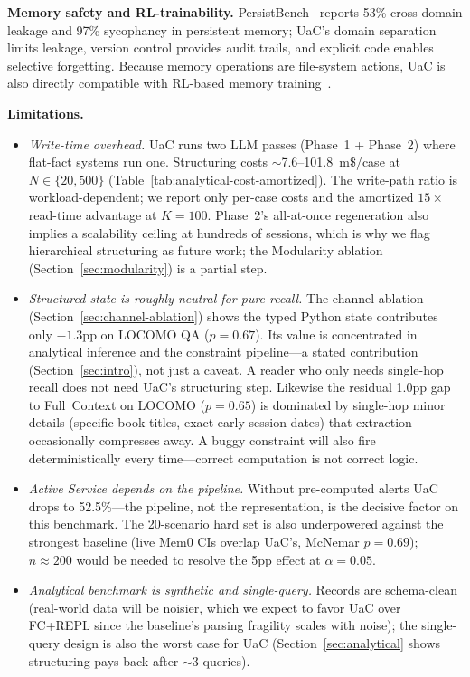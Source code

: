 \textbf{Memory safety and RL-trainability.} PersistBench~\citep{pulipaka2026persistbench} reports 53\% cross-domain leakage and 97\% sycophancy in persistent memory; UaC's domain separation limits leakage, version control provides audit trails, and explicit code enables selective forgetting. Because memory operations are file-system actions, UaC is also directly compatible with RL-based memory training~\citep{yan2025memoryr1, yu2026agemem, wang2025memalpha}.

\textbf{Limitations.}\label{sec:limits}
\begin{itemize}[leftmargin=*]
\item \emph{Write-time overhead.} UaC runs two LLM passes (Phase~1 + Phase~2) where flat-fact systems run one. Structuring costs $\sim$7.6--101.8~m\$/case at $N{\in}\{20,500\}$ (Table~\ref{tab:analytical-cost-amortized}). The write-path ratio is workload-dependent; we report only per-case costs and the amortized $15\times$ read-time advantage at $K{=}100$. Phase~2's all-at-once regeneration also implies a scalability ceiling at hundreds of sessions, which is why we flag hierarchical structuring as future work; the Modularity ablation (Section~\ref{sec:modularity}) is a partial step.
\item \emph{Structured state is roughly neutral for pure recall.} The channel ablation (Section~\ref{sec:channel-ablation}) shows the typed Python state contributes only $-1.3$pp on LOCOMO QA ($p{=}0.67$). Its value is concentrated in analytical inference and the constraint pipeline---a stated contribution (Section~\ref{sec:intro}), not just a caveat. A reader who only needs single-hop recall does not need UaC's structuring step. Likewise the residual 1.0pp gap to Full~Context on LOCOMO ($p{=}0.65$) is dominated by single-hop minor details (specific book titles, exact early-session dates) that extraction occasionally compresses away. A buggy constraint will also fire deterministically every time---correct computation is not correct logic.
\item \emph{Active Service depends on the pipeline.} Without pre-computed alerts UaC drops to 52.5\%---the pipeline, not the representation, is the decisive factor on this benchmark. The 20-scenario hard set is also underpowered against the strongest baseline (live Mem0 CIs overlap UaC's, McNemar $p{=}0.69$); $n \approx 200$ would be needed to resolve the 5pp effect at $\alpha{=}0.05$.
\item \emph{Analytical benchmark is synthetic and single-query.} Records are schema-clean (real-world data will be noisier, which we expect to favor UaC over FC+REPL since the baseline's parsing fragility scales with noise); the single-query design is also the worst case for UaC (Section~\ref{sec:analytical} shows structuring pays back after $\sim$3 queries).

\end{itemize}
